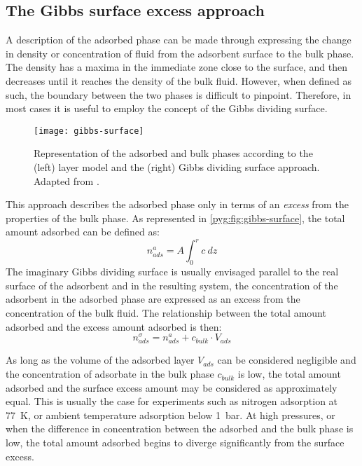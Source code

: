 \subsection{The Gibbs surface excess approach}\label{pyg:models:gibbs}

A description of the adsorbed phase can be made through
expressing the change in density or concentration of fluid
from the adsorbent surface to the bulk phase. The density
has a maxima in the immediate zone close to the surface, and then
decreases until it reaches the density of the bulk fluid.
However, when defined as such, the boundary between the
two phases is difficult to pinpoint.
Therefore, in most cases it is useful to employ the concept
of the Gibbs dividing surface.

\begin{figure}[htb]
	\centering
	\texttt{[image: gibbs-surface]}
	\caption{
		Representation of the adsorbed and bulk phases according to
		the (left) layer model and the (right) Gibbs dividing surface
		approach. Adapted from \citet{rouquerolAdsorptionPowdersPorous2013}.
	}\label{pyg:fig:gibbs-surface}
\end{figure}

This approach describes the adsorbed phase only in terms
of an \textit{excess} from the properties of the bulk phase.
As represented in \autoref{pyg:fig:gibbs-surface}, the total
amount adsorbed can be defined as:
%
\begin{equation}
	n_{ads}^{a} = A \int_0^r c\ dz
\end{equation}
%
The imaginary Gibbs dividing surface is usually envisaged parallel to
the real surface of the adsorbent and in the resulting system, the
concentration of the adsorbent in the adsorbed phase are
expressed as an excess from the concentration of the bulk fluid.
The relationship between the total amount adsorbed and the
excess amount adsorbed is then:
%
\begin{equation}\label{pyg:eqn:total-excess}
	n_{ads}^{\sigma} = n_{ads}^{a} +  c_{bulk} \cdot V_{ads}
\end{equation}

As long as the volume of the adsorbed layer \(V_{ads}\) can be
considered negligible and the concentration of adsorbate in the bulk
phase \(c_{bulk}\) is low, the total amount adsorbed and the surface
excess amount may be considered as approximately equal.
This is usually the case for experiments such as nitrogen
adsorption at \SI{77}{\kelvin}, or ambient temperature adsorption
below \SI{1}{\bar}.
At high pressures, or when the difference in concentration between
the adsorbed and the bulk phase is low, the total amount adsorbed
begins to diverge significantly from the surface excess.

